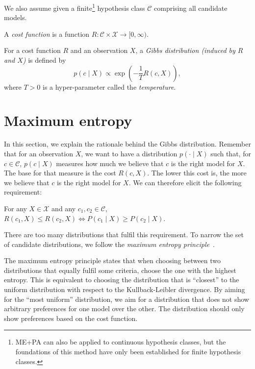 We also assume given a finite\footnote{ME+PA can also be applied to continuous hypothesis classes, but the foundations of this method have only been established for finite hypothesis classes.} hypothesis class $\mathcal{C}$ comprising all candidate models.

\begin{definition}
A \emph{cost function} is a function $R : \mathcal{C} \times \mathcal{X} \to [0, \infty)$.
\label{def:cost_fun}
\end{definition}

\begin{definition}
For a cost function $R$ and an observation $X$, a \emph{Gibbs distribution (induced by $R$ and $X$)} is defined by
%
\begin{equation}
p(c \mid X) \propto \exp\left(- \frac{1}{T} R(c, X)\right),
\end{equation}
%
where $T > 0$ is a hyper-parameter called the \emph{temperature}.
\label{def:gibbs_dist}
\end{definition}

\section{Maximum entropy}
\label{sec:max_entropy}

In this section, we explain the rationale behind the Gibbs distribution. Remember that for an observation $X$, we want to have a distribution $p(\cdot \mid X)$ such that, for $c \in \mathcal{C}$, $p(c \mid X)$ measures how much we believe that $c$ is the right model for $X$. The base for that measure is the cost $R(c, X)$. The lower this cost is, the more we believe that $c$ is the right model for $X$. We can therefore elicit the following requirement:

\begin{requirement}

For any $X \in \mathcal{X}$ and any $c_1, c_2 \in \mathcal{C}$, $R(c_1, X) \leq R(c_2, X)\Leftrightarrow P(c_1 \mid X) \geq P(c_2 \mid X)$.

\end{requirement}

There are too many distributions that fulfil this requirement. To narrow the set of candidate distributions, we follow the \emph{maximum entropy principle}~\cite{jaynes1957information, jaynes1957information2}. 

The maximum entropy principle states that when choosing between two distributions that equally fulfil some criteria, choose the one with the highest entropy. This is equivalent to choosing the distribution that is ``closest'' to the uniform distribution with respect to the Kullback-Leibler divergence. By aiming for the ``most uniform'' distribution, we aim for a distribution that does not show arbitrary preferences for one model over the other. The distribution should only show preferences based on the cost function.

